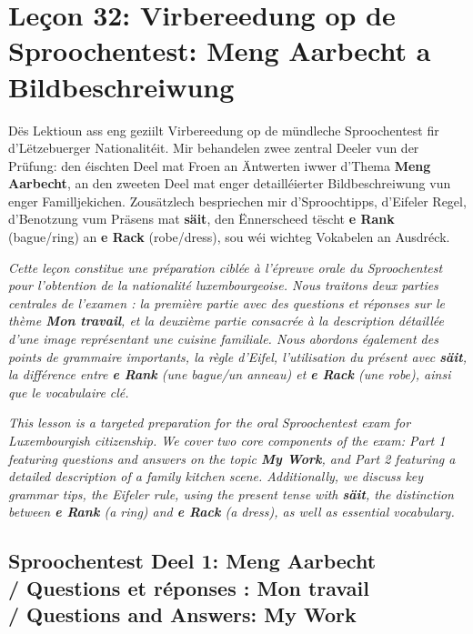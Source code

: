 \chapter{Leçon 32: Virbereedung op de Sproochentest: Meng Aarbecht a Bildbeschreiwung}

Dës Lektioun ass eng geziilt Virbereedung op de mündleche Sproochentest fir d'Lëtzebuerger Nationalitéit. Mir behandelen zwee zentral Deeler vun der Prüfung: den éischten Deel mat Froen an Äntwerten iwwer d'Thema \textbf{Meng Aarbecht}, an den zweeten Deel mat enger detailléierter Bildbeschreiwung vun enger Familljekichen. Zousätzlech bespriechen mir d'Sproochtipps, d'Eifeler Regel, d'Benotzung vum Präsens mat \textbf{säit}, den Ënnerscheed tëscht \textbf{e Rank} (bague/ring) an \textbf{e Rack} (robe/dress), sou wéi wichteg Vokabelen an Ausdréck.

\textit{Cette leçon constitue une préparation ciblée à l'épreuve orale du Sproochentest pour l'obtention de la nationalité luxembourgeoise. Nous traitons deux parties centrales de l'examen : la première partie avec des questions et réponses sur le thème \textbf{Mon travail}, et la deuxième partie consacrée à la description détaillée d'une image représentant une cuisine familiale. Nous abordons également des points de grammaire importants, la règle d'Eifel, l'utilisation du présent avec \textbf{säit}, la différence entre \textbf{e Rank} (une bague/un anneau) et \textbf{e Rack} (une robe), ainsi que le vocabulaire clé.}

\textit{This lesson is a targeted preparation for the oral Sproochentest exam for Luxembourgish citizenship. We cover two core components of the exam: Part 1 featuring questions and answers on the topic \textbf{My Work}, and Part 2 featuring a detailed description of a family kitchen scene. Additionally, we discuss key grammar tips, the Eifeler rule, using the present tense with \textbf{säit}, the distinction between \textbf{e Rank} (a ring) and \textbf{e Rack} (a dress), as well as essential vocabulary.}

\vspace{1.5em}

\section[Sproochentest Deel 1: Meng Aarbecht / Q\&A]{Sproochentest Deel 1: Meng Aarbecht \\/ Questions et réponses : Mon travail \\/ Questions and Answers: My Work}


